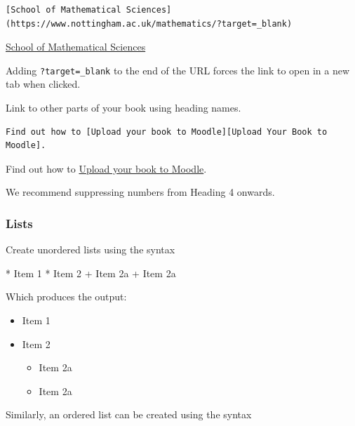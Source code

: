 \documentclass[
  letterpaper,
  oneside]{book}
\newenvironment{Shaded}{\begin{snugshade}}{\end{snugshade}}
\newcommand{\NormalTok}[1]{\textcolor[rgb]{0.00,0.23,0.31}{#1}}
\newcommand{\SpecialStringTok}[1]{\textcolor[rgb]{0.13,0.47,0.30}{#1}}
\providecommand{\tightlist}{%
  \setlength{\itemsep}{0pt}\setlength{\parskip}{0pt}}\usepackage{longtable,booktabs,array}
\numberwithin{equation}{section}
\numberwithin{figure}{section}
\theoremstyle{break}
\theoremstyle{plain}
\theoremstyle{remark}
\begin{document}
\begin{verbatim}
[School of Mathematical Sciences](https://www.nottingham.ac.uk/mathematics/?target=_blank)
\end{verbatim}

\href{https://www.nottingham.ac.uk/mathematics/?target=_blank}{School of
Mathematical Sciences}

Adding \texttt{?target=\_blank} to the end of the URL forces the link to
open in a new tab when clicked.

Link to other parts of your book using heading names.

\begin{verbatim}
Find out how to [Upload your book to Moodle][Upload Your Book to Moodle].
\end{verbatim}

Find out how to \hyperref[upload-your-book-to-moodle]{Upload your book
to Moodle}.

We recommend suppressing numbers from Heading 4 onwards.

\subsubsection*{Lists}\label{lists}

Create unordered lists using the syntax

\begin{Shaded}
\begin{Highlighting}[]
\SpecialStringTok{* }\NormalTok{Item 1}
\SpecialStringTok{* }\NormalTok{Item 2}
\SpecialStringTok{    + }\NormalTok{Item 2a}
\SpecialStringTok{    + }\NormalTok{Item 2a}
\end{Highlighting}
\end{Shaded}

Which produces the output:

\begin{itemize}
\tightlist
\item
  Item 1
\item
  Item 2

  \begin{itemize}
  \tightlist
  \item
    Item 2a
  \item
    Item 2a
  \end{itemize}
\end{itemize}

Similarly, an ordered list can be created using the syntax
\end{document}
